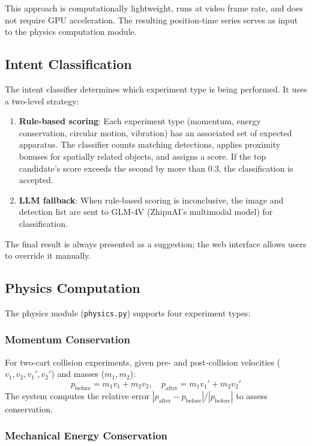 \documentclass[12pt]{article}
\begin{document}
This approach is computationally lightweight, runs at video frame rate, and does not require GPU acceleration. The resulting position-time series serves as input to the physics computation module.

\subsection{Intent Classification}

The intent classifier determines which experiment type is being performed. It uses a two-level strategy:

\begin{enumerate}[noitemsep]
  \item \textbf{Rule-based scoring}: Each experiment type (momentum, energy conservation, circular motion, vibration) has an associated set of expected apparatus. The classifier counts matching detections, applies proximity bonuses for spatially related objects, and assigns a score. If the top candidate's score exceeds the second by more than 0.3, the classification is accepted.
  \item \textbf{LLM fallback}: When rule-based scoring is inconclusive, the image and detection list are sent to GLM-4V (ZhipuAI's multimodal model) for classification.
\end{enumerate}

The final result is always presented as a suggestion; the web interface allows users to override it manually.

\subsection{Physics Computation}

The physics module (\texttt{physics.py}) supports four experiment types:

\subsubsection{Momentum Conservation}

For two-cart collision experiments, given pre- and post-collision velocities ($v_1, v_2, v_1', v_2'$) and masses ($m_1, m_2$):
\[
p_{\text{before}} = m_1 v_1 + m_2 v_2, \quad p_{\text{after}} = m_1 v_1' + m_2 v_2'
\]
The system computes the relative error $|p_{\text{after}} - p_{\text{before}}| / |p_{\text{before}}|$ to assess conservation.

\subsubsection{Mechanical Energy Conservation}
\end{document}

